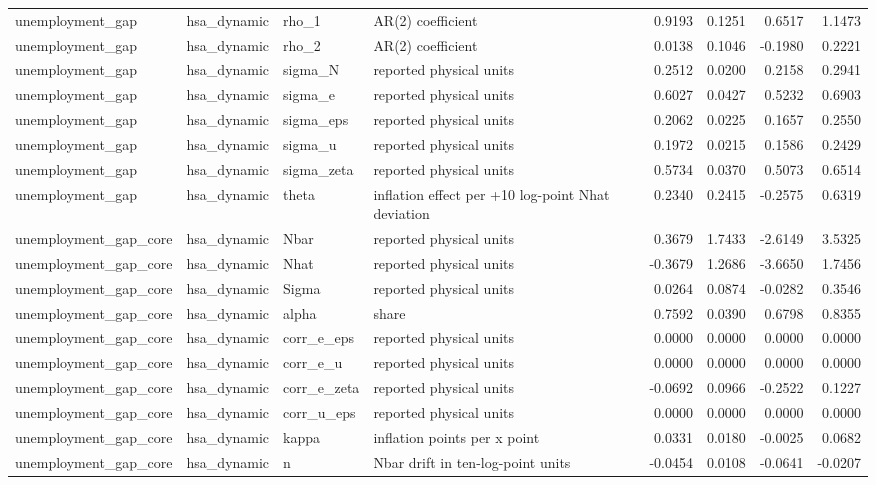 \begin{tabular}{llllrrrr}
unemployment\_gap & hsa\_dynamic & rho\_1 & AR(2) coefficient & 0.9193 & 0.1251 & 0.6517 & 1.1473 \\
unemployment\_gap & hsa\_dynamic & rho\_2 & AR(2) coefficient & 0.0138 & 0.1046 & -0.1980 & 0.2221 \\
unemployment\_gap & hsa\_dynamic & sigma\_N & reported physical units & 0.2512 & 0.0200 & 0.2158 & 0.2941 \\
unemployment\_gap & hsa\_dynamic & sigma\_e & reported physical units & 0.6027 & 0.0427 & 0.5232 & 0.6903 \\
unemployment\_gap & hsa\_dynamic & sigma\_eps & reported physical units & 0.2062 & 0.0225 & 0.1657 & 0.2550 \\
unemployment\_gap & hsa\_dynamic & sigma\_u & reported physical units & 0.1972 & 0.0215 & 0.1586 & 0.2429 \\
unemployment\_gap & hsa\_dynamic & sigma\_zeta & reported physical units & 0.5734 & 0.0370 & 0.5073 & 0.6514 \\
unemployment\_gap & hsa\_dynamic & theta & inflation effect per +10 log-point Nhat deviation & 0.2340 & 0.2415 & -0.2575 & 0.6319 \\
unemployment\_gap\_core & hsa\_dynamic & Nbar & reported physical units & 0.3679 & 1.7433 & -2.6149 & 3.5325 \\
unemployment\_gap\_core & hsa\_dynamic & Nhat & reported physical units & -0.3679 & 1.2686 & -3.6650 & 1.7456 \\
unemployment\_gap\_core & hsa\_dynamic & Sigma & reported physical units & 0.0264 & 0.0874 & -0.0282 & 0.3546 \\
unemployment\_gap\_core & hsa\_dynamic & alpha & share & 0.7592 & 0.0390 & 0.6798 & 0.8355 \\
unemployment\_gap\_core & hsa\_dynamic & corr\_e\_eps & reported physical units & 0.0000 & 0.0000 & 0.0000 & 0.0000 \\
unemployment\_gap\_core & hsa\_dynamic & corr\_e\_u & reported physical units & 0.0000 & 0.0000 & 0.0000 & 0.0000 \\
unemployment\_gap\_core & hsa\_dynamic & corr\_e\_zeta & reported physical units & -0.0692 & 0.0966 & -0.2522 & 0.1227 \\
unemployment\_gap\_core & hsa\_dynamic & corr\_u\_eps & reported physical units & 0.0000 & 0.0000 & 0.0000 & 0.0000 \\
unemployment\_gap\_core & hsa\_dynamic & kappa & inflation points per x point & 0.0331 & 0.0180 & -0.0025 & 0.0682 \\
unemployment\_gap\_core & hsa\_dynamic & n & Nbar drift in ten-log-point units & -0.0454 & 0.0108 & -0.0641 & -0.0207 \\

\end{tabular}
